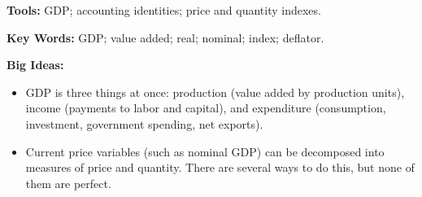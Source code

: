 \textbf{Tools:} GDP; accounting identities; price and quantity indexes.

\textbf{Key Words:} GDP; value added; real; nominal; index; deflator.

\textbf{Big Ideas:}
\begin{itemize}
    \item GDP is three things at once:  production (value added by production units), income (payments to labor and capital), and expenditure (consumption, investment, government spending, net exports).

    \item Current price variables (such as nominal GDP) can be decomposed into measures of price and quantity. There are several ways to do this, but none of them are perfect.
\end{itemize}

%
